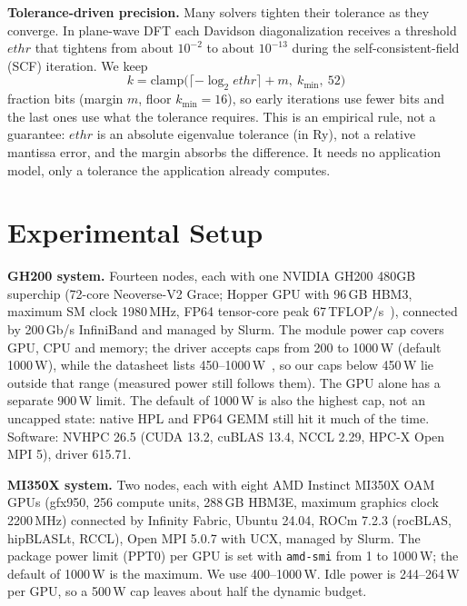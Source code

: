\documentclass[conference]{IEEEtran}
\newcommand{\W}{\,W}
\begin{document}
\textbf{Tolerance-driven precision.} Many solvers tighten their tolerance as they converge. In plane-wave DFT each
Davidson diagonalization receives a threshold $\mathit{ethr}$ that tightens from about $10^{-2}$ to about $10^{-13}$
during the self-consistent-field (SCF) iteration. We keep
\begin{equation}
k = \mathrm{clamp}\bigl(\lceil -\log_2 \mathit{ethr}\rceil + m,\ k_{\min},\ 52\bigr)
\end{equation}
fraction bits (margin $m$, floor $k_{\min}=16$), so early iterations use fewer bits and the last ones use what the
tolerance requires. This is an empirical rule, not a guarantee: $\mathit{ethr}$ is an absolute eigenvalue tolerance
(in Ry), not a relative mantissa error, and the margin absorbs the difference. It needs no application model, only
a tolerance the application already computes.

\section{Experimental Setup}\label{sec:setup}

\textbf{GH200 system.} Fourteen nodes, each with one NVIDIA GH200 480GB superchip (72-core Neoverse-V2 Grace; Hopper
GPU with 96\,GB HBM3, maximum SM clock 1980\,MHz, FP64 tensor-core peak 67\,TFLOP/s~\cite{NVIDIAGH200}), connected by
200\,Gb/s InfiniBand and managed by Slurm. The module power cap covers GPU, CPU and memory; the driver accepts caps
from 200 to 1000\W{} (default 1000\W), while the datasheet lists 450--1000\W~\cite{NVIDIAGH200}, so our caps below
450\W{} lie outside that range (measured power still follows them). The GPU alone has a separate 900\W{} limit.
The default of 1000\W{} is also the highest cap, not an uncapped state: native HPL and FP64 GEMM still hit it much of
the time. Software: NVHPC 26.5 (CUDA 13.2, cuBLAS 13.4, NCCL 2.29, HPC-X Open MPI 5), driver 615.71.

\textbf{MI350X system.} Two nodes, each with eight AMD Instinct MI350X OAM GPUs (gfx950, 256 compute units, 288\,GB
HBM3E, maximum graphics clock 2200\,MHz) connected by Infinity Fabric, Ubuntu 24.04, ROCm 7.2.3 (rocBLAS, hipBLASLt,
RCCL), Open MPI 5.0.7 with UCX, managed by Slurm. The package power limit (PPT0) per GPU is set with \texttt{amd-smi}
from 1 to 1000\W; the default of 1000\W{} is the maximum. We use 400--1000\W. Idle power is 244--264\W{} per GPU,
so a 500\W{} cap leaves about half the dynamic budget.
\end{document}
